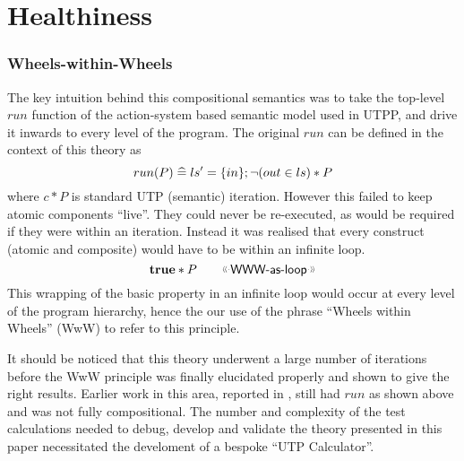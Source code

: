 \section{Healthiness}\label{sec:health}


\subsubsection{Wheels-within-Wheels}\label{ssec:WwW}

The key intuition behind this compositional semantics was to take the
top-level $run$ function of the action-system based semantic model used in UTPP,
and drive it inwards to every level of the program.
The original $run$ can be defined in the context of this theory as
\[
  run(P) \mathrel{\widehat=}  ls' = \{{in}\} ; \lnot (out \in ls) * P
\]
where $c * P$ is standard UTP (semantic) iteration.
However this failed to keep atomic components ``live''.
They could never be re-executed,
as would be required if they were within an iteration.
Instead it was realised that every construct (atomic and composite)
would have to be within an infinite loop.%
\[
    \true * P \qquad \elabel{WWW-as-loop}
\]
This wrapping of the basic property in an infinite loop
would occur at every level of the program hierarchy,
hence the our use of the phrase ``Wheels within Wheels''
(WwW) to refer to this principle.

It should be noticed that this theory underwent
a large number of iterations before the WwW principle was finally
elucidated properly and shown to give the right results.
Earlier work in this area, reported in \cite{conf/tase/BMN16},
still had $run$ as shown above and was not fully compositional.
The number and complexity of the test calculations needed to debug,
develop and validate the theory presented in this paper
necessitated the develoment of a bespoke ``UTP Calculator''\cite{DBLP:conf/utp/Butterfield16}.

